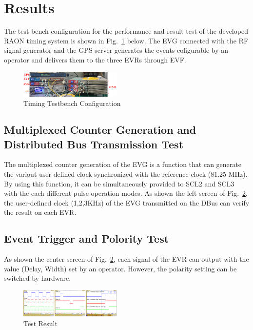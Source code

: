\documentclass[journal,reqno]{IEEEtran}
\begin{document}
\section{Results}
The test bench configuration for the performance and result test of the developed RAON timing system is shown in Fig.~\ref{timing_testbench} below. The EVG connected with the RF signal generator and the GPS server generates the events cofigurable by an operator and delivers them to the three EVRs through EVF.

\begin{figure}[!htb]
	\centering
	\includegraphics*[width=0.45\textwidth, height=0.12\textwidth]{img18.png}
	\caption{Timing Testbench Configuration}
	\label{timing_testbench}
\end{figure}

\subsection{Multiplexed Counter Generation and Distributed Bus Transmission Test}
The multiplexed counter generation of the EVG is a function that can generate the variout user-defined clock synchronized with the reference clock (81.25 MHz). By using this function, it can be simultaneously provided to SCL2 and SCL3 with the each different pulse operation modes.
As shown the left screen of Fig.~\ref{timing_result}, the user-defined clock (1,2,3KHz) of the EVG transmitted on the DBus can verify the result on each EVR.

\subsection{Event Trigger and Polority Test}
As shown the center screen of Fig.~\ref{timing_result}, each signal of the EVR can output with the value (Delay, Width) set by an operator.
However, the polarity setting can be switched by hardware.
 
\begin{figure}[!htb]
	\centering
	\includegraphics*[width=0.45\textwidth, height=0.15\textwidth]{img22.png}
	\caption{Test Result}
	\label{timing_result}
\end{figure}
\end{document}
